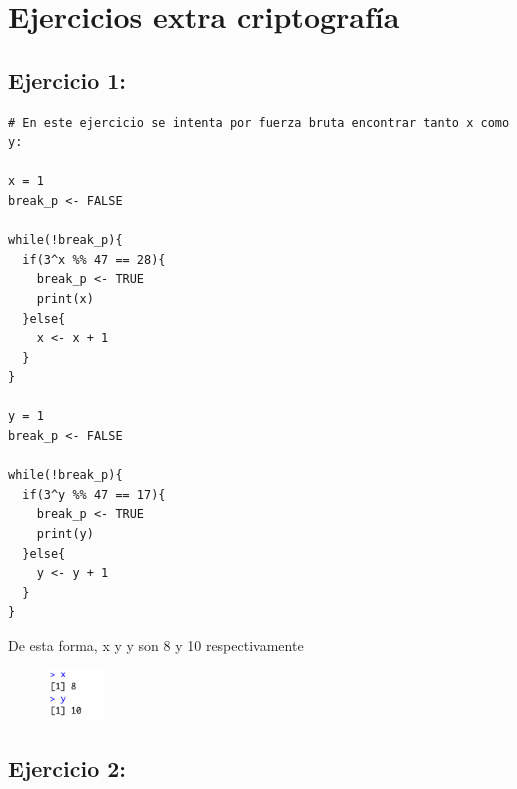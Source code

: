 \chapter{Ejercicios extra criptografía}


\section{Ejercicio 1:}


\begin{lstlisting}
# En este ejercicio se intenta por fuerza bruta encontrar tanto x como y:

x = 1
break_p <- FALSE

while(!break_p){
  if(3^x %% 47 == 28){
    break_p <- TRUE
    print(x)
  }else{
    x <- x + 1 
  }
}

y = 1
break_p <- FALSE

while(!break_p){
  if(3^y %% 47 == 17){
    break_p <- TRUE
    print(y)
  }else{
    y <- y + 1 
  }
}

\end{lstlisting}

De esta forma, x y y son 8 y 10 respectivamente



\begin{figure}[!h]
        \includegraphics[width=15mm]{imgs/Captura de Pantalla 2021-02-13 a la(s) 14.30.24.png}
\end{figure}

\newpage 


\section{Ejercicio 2:}

